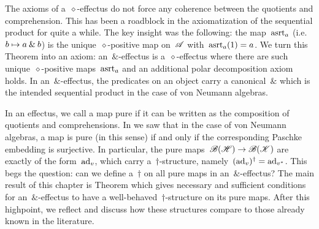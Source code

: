 \documentclass[b]{subfiles}
\begin{document}
\begin{parsec}
\begin{point}%
The axioms of a~$\diamond$-effectus do not force
    any coherence between the quotients and comprehension.
This has been a roadblock in the axiomatization
    of the sequential product for quite a while.
The key insight was the following:
    the map~$\mathrm{asrt}_a$ (i.e.~$b\mapsto a \mathbin{\&} b$)
    is the unique~$\diamond$-positive map on~$\mathscr{A}$
    with~$\mathrm{asrt}_a(1) = a$.
We turn this Theorem into an axiom:
    an~$\&$-effectus is
    a~$\diamond$-effectus
    where there are such unique~$\diamond$-positive maps~$\mathrm{asrt}_a$
    and an additional polar decomposition axiom holds.
In an~$\&$-effectus, the predicates on an object carry a canonical~$\&$
    which is the intended sequential product in
    the case of von Neumann algebras.
\end{point}
\begin{point}%
In an effectus, we call a map pure if it can be written
    as the composition of quotients and comprehensions.
In \TODO{} we saw that in the case of von Neumann algebras,
    a map is pure (in this sense) if and only if the corresponding Paschke
    embedding is surjective.
In particular, the pure maps~$\mathscr{B}(\mathscr{H}) \to \mathscr{B}(\mathscr{K})$
    are exactly of the form~$\mathrm{ad}_v$,
    which carry a~$\dagger$-structure,
    namely~$(\mathrm{ad}_v)^\dagger = \mathrm{ad}_{v^*}$.
This begs the question: can we define a~$\dagger$ on all pure maps
    in an~$\&$-effectus?
The main result of this chapter
    is Theorem 
    which gives  necessary and sufficient conditions
    for an~$\&$-effectus
    to have a well-behaved~$\dagger$-structure on its pure maps.
After this highpoint, we reflect and discuss how these
    structures compare to those already known in the literature.
\end{point}
\end{parsec}
\end{document}
